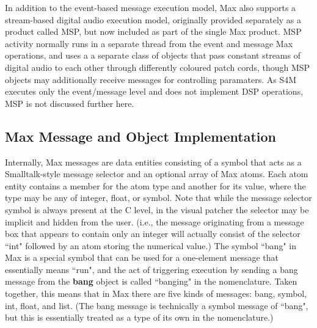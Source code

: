 \documentclass[acmsmall]{acmart}
\begin{document}
In addition to the event-based message execution model, Max also supports a stream-based digital 
audio execution model, originally provided separately as a product called MSP, but now included 
as part of the single Max product.
MSP activity normally runs in a separate thread from the event and message Max operations, and uses a  
a separate class of objects that pass constant streams of digital audio to each other through differently 
coloured patch cords, though MSP objects may additionally receive messages for controlling paramaters. As  
S4M executes only the event/message level and does not implement DSP operations, MSP is not 
discussed further here. 



\subsection{Max Message and Object Implementation} 

Internally, Max messages are data entities consisting of a symbol that acts
as a Smalltalk-style message selector and an optional array of Max atoms. 
Each atom entity contains a member for the atom type and another for its value, 
where the type may be any of integer, float, or symbol. 
Note that while the message selector symbol is always present at the C level,
in the visual patcher the selector may be implicit and hidden from the user. 
(i.e., the message originating from a message box that appears to contain only an integer
will actually consist of the selector ``int" followed by an atom storing the numerical value.)
The symbol ``bang" in Max is a special symbol that can be used for a one-element message 
that essentially means ``run", and the act of triggering execution by sending a bang
message from the \textbf{bang} object is called ``banging" in the nomenclature.
Taken together, this means that in Max there are five kinds of messages: 
bang, symbol, int, float, and list. (The bang message is technically a symbol message
of ``bang", but this is essentially treated as a type of its own in the nomenclature.) 
\end{document}
